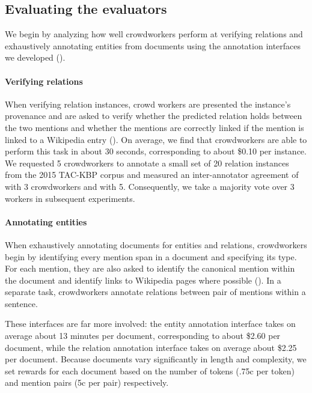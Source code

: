 \subsection{Evaluating the evaluators}
We begin by analyzing how well crowdworkers perform at verifying relations and exhaustively annotating entities from documents using the annotation interfaces we developed ().%

\paragraph{Verifying relations}
When verifying relation instances, 
  crowd workers are presented the instance's provenance and are asked to verify
  whether the predicted relation holds between the two mentions and
  whether the mentions are correctly linked if the mention is linked to a Wikipedia entry
  (). 
On average, we find that crowdworkers are able to perform this task in about 30 seconds, corresponding to about \$0.10 per instance.
We requested 5 crowdworkers to annotate a small set of 20 relation instances from the 2015 TAC-KBP corpus 
and measured an inter-annotator agreement of  with 3 crowdworkers and  with 5.
Consequently, we take a majority vote over 3 workers in subsequent experiments.

\paragraph{Annotating entities}
When exhaustively annotating documents for entities and relations,
  crowdworkers begin by identifying every mention span in a document and specifying its type.
  For each mention, they are also asked to identify the canonical mention within the document
  and identify links to Wikipedia pages where possible ().
In a separate task, crowdworkers annotate relations between pair of mentions within a sentence.

These interfaces are far more involved: the entity annotation interface takes on average about 13 minutes per document, corresponding to about \$2.60 per document, while the relation annotation interface takes on average about \$2.25 per document.
Because documents vary significantly in length and complexity, we set rewards for each document based on the number of tokens (.75c per token) and mention pairs (5c per pair) respectively.

